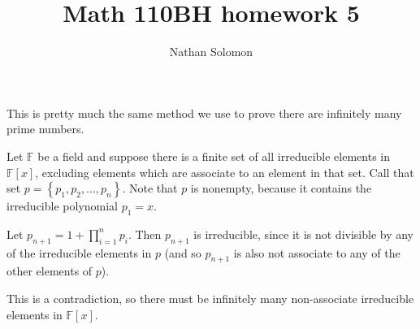 \documentclass[12pt]{article}
\begin{document}
\title{Math 110BH homework 5}
\author{Nathan Solomon}
\maketitle

\section{}
\noindent{}\bigskip\par
This is pretty much the same method we use to prove there are infinitely many prime numbers.
\par
Let $\mathbb{F}$ be a field and suppose there is a finite set of all irreducible elements in $\mathbb{F}[x]$, excluding elements which are associate to an element in that set. Call that set $p= \left\{ p_1, p_2, \dots, p_n \right\}$. Note that $p$ is nonempty, because it contains the irreducible polynomial $p_1=x$.
\par
Let $p_{n+1}=1+\prod_{i=1}^n p_i$. Then $p_{n+1}$ is irreducible, since it is not divisible by any of the irreducible elements in $p$ (and so $p_{n+1}$ is also not associate to any of the other elements of $p$).
\par
This is a contradiction, so there must be infinitely many non-associate irreducible elements in $\mathbb{F}[x]$.
\end{document}
